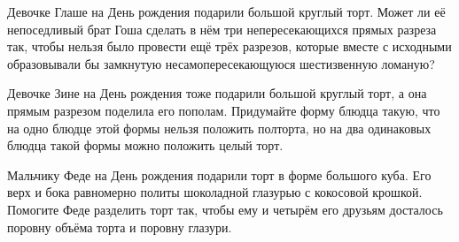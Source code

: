 ﻿
\begin{itemize}

\itA Девочке Глаше на День рождения подарили большой круглый торт. Может ли её непоседливый брат Гоша сделать в нём три непересекающихся прямых разреза так, чтобы нельзя было провести ещё трёх разрезов, которые вместе с исходными образовывали бы замкнутую несамопересекающуюся шестизвенную ломаную?

\itB Девочке Зине на День рождения тоже подарили большой круглый торт, а она прямым разрезом поделила его пополам. Придумайте форму блюдца такую, что на одно блюдце этой формы нельзя положить полторта, но на два одинаковых блюдца такой формы можно положить целый торт.

\itC Мальчику Феде на День рождения подарили торт в форме большого куба. Его верх и бока равномерно политы шоколадной глазурью с кокосовой крошкой. Помогите Феде разделить торт так, чтобы ему и четырём его друзьям досталось поровну объёма торта и поровну глазури.
\end{itemize}
